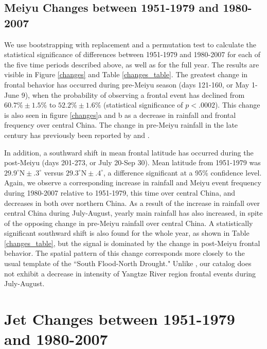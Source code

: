 \documentclass[draft,grl]{AGUTeX}
\begin{document}
\begin{article}
\subsection{Meiyu Changes between 1951-1979 and 1980-2007}
	
	We use bootstrapping with replacement and a permutation test to calculate the statistical significance of differences between 1951-1979 and 1980-2007 for each of the five time periods described above, as well as for the full year. The results are visible in Figure \ref{changes} and Table \ref{changes_table}. The greatest change in frontal behavior has occurred during pre-Meiyu season (days 121-160, or May 1-June 9), when the probability of observing a frontal event has declined from $60.7\% \pm 1.5\%$ to $52.2\% \pm 1.6\%$ (statistical significance of $p < .0002$). This change is also seen in figure \ref{changes}a and b as a decrease in rainfall and frontal frequency over central China. The change in pre-Meiyu rainfall in the late  century has previously been reported by \citet{Xin2006} and \citet{Wang2009}.
	
	In addition, a southward shift in mean frontal latitude has occurred during the post-Meiyu (days 201-273, or July 20-Sep 30). Mean latitude from 1951-1979 was $29.9^\circ \textrm{N} \pm .3^\circ$ versus $29.3^\circ \textrm{N} \pm .4^\circ$, a difference significant at a 95\% confidence level. Again, we observe a corresponding increase in rainfall and Meiyu event frequency during 1980-2007 relative to 1951-1979, this time over central China, and decreases in both over northern China. As a result of the increase in rainfall over central China during July-August, yearly main rainfall has also increased, in spite of the opposing change in pre-Meiyu rainfall over central China. A statistically significant southward shift is also found for the whole year, as shown in Table \ref{changes_table}, but the signal is dominated by the change in post-Meiyu frontal behavior. The spatial pattern of this change corresponds more closely to the usual template of the ``South Flood-North Drought." Unlike \citep{Yu2010},  our catalog does not exhibit a decrease in intensity of Yangtze River region frontal events during July-August.
	
\section{Jet Changes between 1951-1979 and 1980-2007}


\end{article}
\end{document}

